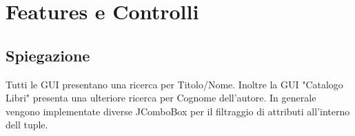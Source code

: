 \chapter{Features e Controlli}
\section{Spiegazione}
Tutti le GUI presentano una ricerca per Titolo/Nome. Inoltre la GUI "Catalogo Libri" presenta una ulteriore ricerca per Cognome dell'autore. In generale vengono implementate diverse JComboBox per il filtraggio di attributi all'interno dell tuple.